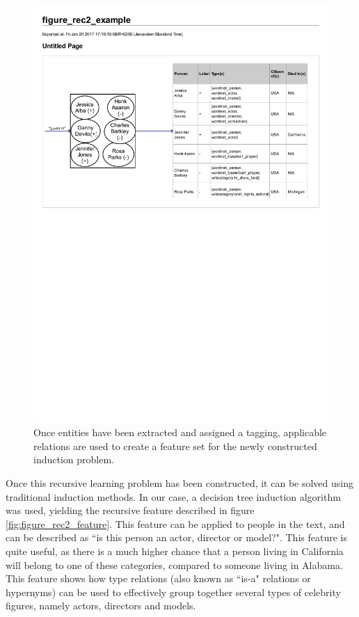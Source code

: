 \documentclass[twoside,11pt]{article}
\theoremstyle{definition}
\begin{document}
\begin{figure}[!h]
	\centering
	\includegraphics[width=\linewidth]{figure_rec2_example}
	\caption{Once entities have been extracted and assigned a tagging, applicable relations are used to create a feature set for the newly constructed induction problem.}
	\label{fig:figure_rec2_example}
\end{figure}

Once this recursive learning problem has been constructed, it can be solved using traditional induction methods. In our case, a decision tree induction algorithm was used, yielding the recursive feature described in figure \ref{fig:figure_rec2_feature}. This feature can be applied to people in the text, and can be described as ``is this person an actor, director or model?". This feature is quite useful, as there is a much higher chance that a person living in California will belong to one of these categories, compared to someone living in Alabama. This feature shows how type relations (also known as ``is-a" relations or hypernyms) can be used to effectively group together several types of celebrity figures, namely actors, directors and models.
\end{document}
